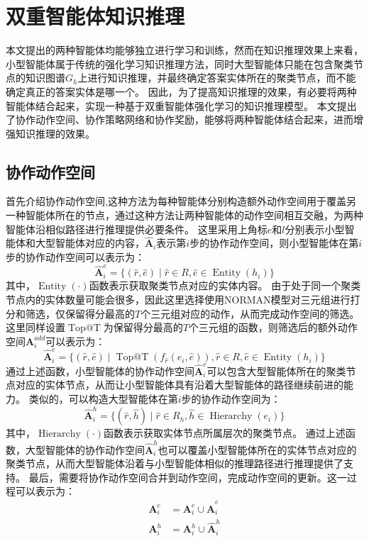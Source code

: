 \documentclass[algorithmlist, AutoFakeBold, AutoFakeSlant, figurelist, tablelist, nomlist, engineering, openany]{seuthesix} %
\begin{document}
\section{双重智能体知识推理}
本文提出的两种智能体均能够独立进行学习和训练，然而在知识推理效果上来看，小型智能体属于传统的强化学习知识推理方法，同时大型智能体只能在包含聚类节点的知识图谱$G_h$上进行知识推理，并最终确定答案实体所在的聚类节点，而不能确定真正的答案实体是哪一个。
因此，为了提高知识推理的效果，有必要将两种智能体结合起来，实现一种基于双重智能体强化学习的知识推理模型。
本文提出了协作动作空间、协作策略网络和协作奖励，能够将两种智能体结合起来，进而增强知识推理的效果。

\subsection{协作动作空间}
首先介绍协作动作空间,这种方法为每种智能体分别构造额外动作空间用于覆盖另一种智能体所在的节点，通过这种方法让两种智能体的动作空间相互交融，为两种智能体沿相似路径进行推理提供必要条件。
这里采用上角标$e$和$l$分别表示小型智能体和大型智能体对应的内容，$\bm{\hat{A}}_i$表示第$i$步的协作动作空间，则小型智能体在第$i$步的协作动作空间可以表示为：
\begin{equation}
  \bm{\hat{A}}_i^{e} = \{(\hat{r}, \hat{e}) \mid \hat{r} \in R, \hat{e} \in \operatorname{Entity}(h_i)\}
\end{equation}
其中，$\operatorname{Entity}(\cdot)$函数表示获取聚类节点对应的实体内容。
由于处于同一个聚类节点内的实体数量可能会很多，因此这里选择使用NORMAN模型对三元组进行打分和筛选，仅保留得分最高的$T$个三元组对应的动作，从而完成动作空间的筛选。
这里同样设置$\operatorname{Top@T}$为保留得分最高的$T$个三元组的函数，则筛选后的额外动作空间$\bm{A}_{i}^{add}$可以表示为：
\begin{equation}
  \bm{\hat{A}}_i^{e} = \{(\hat{r}, \hat{e}) \mid \operatorname{Top@T}(f_{\hat{r}}(e_i, \hat{e})), \hat{r} \in R, \hat{e} \in \operatorname{Entity}(h_i) \}
  \label{coo_1}
\end{equation}
通过上述函数，小型智能体的协作动作空间$\bm{\hat{A}}_i^{e}$可以包含大型智能体所在的聚类节点对应的实体节点，从而让小型智能体具有沿着大型智能体的路径继续前进的能力。
类似的，可以构造大型智能体在第$i$步的协作动作空间为：
\begin{equation}
  \bm{\hat{A}}_i^{h} = \{(\hat{r}, \hat{h}) \mid \hat{r} \in R_h, \hat{h} \in \operatorname{Hierarchy}(e_i)\}
  \label{coo_2}
\end{equation}
其中，$\operatorname{Hierarchy}(\cdot)$函数表示获取实体节点所属层次的聚类节点。
通过上述函数，大型智能体的协作动作空间$\bm{\hat{A}}_i^{h}$也可以覆盖小型智能体所在的实体节点对应的聚类节点，从而大型智能体沿着与小型智能体相似的推理路径进行推理提供了支持。
最后，需要将协作动作空间合并到动作空间，完成动作空间的更新。这一过程可以表示为：
\begin{equation}
  \begin{aligned}
    \bm{A}_i^{e} &= \bm{A}_i^{e} \cup \bm{\hat{A}}_i^{e} \\
    \bm{A}_i^{h} &= \bm{A}_i^{h} \cup \bm{\hat{A}}_i^{h}
  \end{aligned}
\end{equation}
\end{document}
